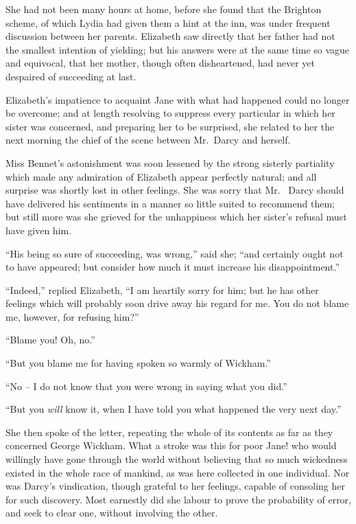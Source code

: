 She had not been many hours at home, before she found
that the Brighton scheme, of which Lydia had given them
a hint at the inn, was under frequent discussion between
her parents. Elizabeth saw directly that her father had
not the smallest intention of yielding; but his answers
were at the same time so vague and equivocal, that her
mother, though often disheartened, had never yet despaired
of succeeding at last.


Elizabeth’s impatience to acquaint Jane with what
had happened could no longer be overcome; and at length
resolving to suppress every particular in which her sister
was concerned, and preparing her to be surprised, she
related to her the next morning the chief of the scene
between Mr.\ Darcy and herself.

Miss Bennet’s astonishment was soon lessened by the
strong sisterly partiality which made any admiration of
Elizabeth appear perfectly natural; and all surprise was
shortly lost in other feelings. She was sorry that Mr.\ %
Darcy should have delivered his sentiments in a manner
so little suited to recommend them; but still more was
she grieved for the unhappiness which her sister’s refusal
must have given him.

“His being so sure of succeeding, was wrong,” said she;
“and certainly ought not to have appeared; but consider
how much it must increase his disappointment.”

“Indeed,” replied Elizabeth, “I am heartily sorry for
him; but he has other feelings which will probably soon
drive away his regard for me. You do not blame me,
however, for refusing him?”

“Blame you! Oh, no.”

“But you blame me for having spoken so warmly of
Wickham.”

“No -- I do not know that you were wrong in saying
what you did.”

“But you \textit{will} know it, when I have told you what
happened the very next day.”

She then spoke of the letter, repeating the whole of its
contents as far as they concerned George Wickham.
What a stroke was this for poor Jane! who would willingly
have gone through the world without believing that so
much wickedness existed in the whole race of mankind,
as was here collected in one individual. Nor was Darcy’s
vindication, though grateful to her feelings, capable of
consoling her for such discovery. Most earnestly did she
labour to prove the probability of error, and seek to clear
one, without involving the other.

